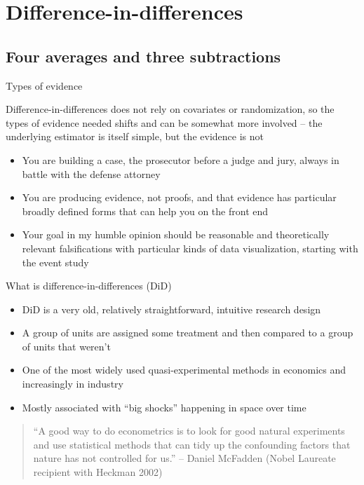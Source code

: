 \documentclass{beamer}
\begin{document}
\section{Difference-in-differences}


\subsection{Four averages and three subtractions}

\begin{frame}{Types of evidence}

Difference-in-differences does not rely on covariates or randomization, so the types of evidence needed shifts and can be somewhat more involved -- the underlying estimator is itself simple, but the evidence is not

\begin{itemize}
\item You are building a case, the prosecutor before a judge and jury, always in battle with the defense attorney
\item You are producing evidence, not proofs, and that evidence has particular broadly defined forms that can help you on the front end
\item Your goal in my humble opinion should be reasonable and theoretically relevant falsifications with particular kinds of data visualization, starting with the event study
\end{itemize}

\end{frame}




\begin{frame}{What is difference-in-differences (DiD)}

\begin{itemize}
\item DiD is a very old, relatively straightforward, intuitive research design
\item A group of units are assigned some treatment and then compared to a group of units that weren't
\item One of the most widely used quasi-experimental methods in economics and increasingly in industry
\item Mostly associated with ``big shocks'' happening in space over time
\end{itemize}


\begin{quote}
``A good way to do econometrics is to look for good natural experiments and use statistical methods that can tidy up the confounding factors that nature has not controlled for us.'' -- Daniel McFadden (Nobel Laureate recipient with Heckman 2002)
\end{quote}

\end{frame}
\end{document}
